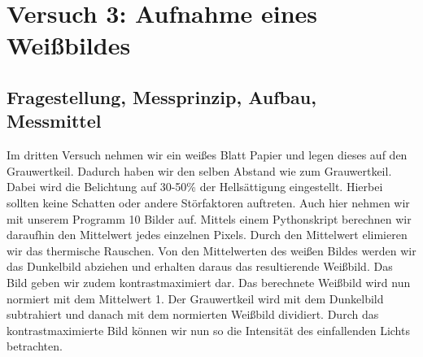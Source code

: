 \documentclass[12pt, oneside, a4paper, \docLanguage]{report}
\begin{document}
\chapter{Versuch 3: Aufnahme eines Weißbildes}
\label{chap:VERSUCH_3}

\section{Fragestellung, Messprinzip, Aufbau, Messmittel}
\label{chap:VERSUCH_3_FRAGESTELLUNG}
Im dritten Versuch nehmen wir ein weißes Blatt Papier und legen dieses auf den Grauwertkeil. Dadurch haben wir den selben Abstand wie zum Grauwertkeil.
Dabei wird die Belichtung auf 30-50\% der Hellsättigung eingestellt.
\newline
Hierbei sollten keine Schatten oder andere Störfaktoren auftreten.
Auch hier nehmen wir mit unserem Programm 10 Bilder auf.
\newline
Mittels einem Pythonskript berechnen wir daraufhin den Mittelwert jedes einzelnen Pixels. Durch den Mittelwert elimieren wir das thermische Rauschen.
Von den Mittelwerten des weißen Bildes werden wir das Dunkelbild abziehen und erhalten daraus das resultierende Weißbild.
Das Bild geben wir zudem kontrastmaximiert dar.
\newline
\newline
Das berechnete Weißbild wird nun normiert mit dem Mittelwert 1.
\newline
Der Grauwertkeil wird mit dem Dunkelbild subtrahiert und danach mit dem normierten Weißbild dividiert.
\newline
Durch das kontrastmaximierte Bild können wir nun so die Intensität des einfallenden Lichts betrachten.
\newpage
\end{document}
